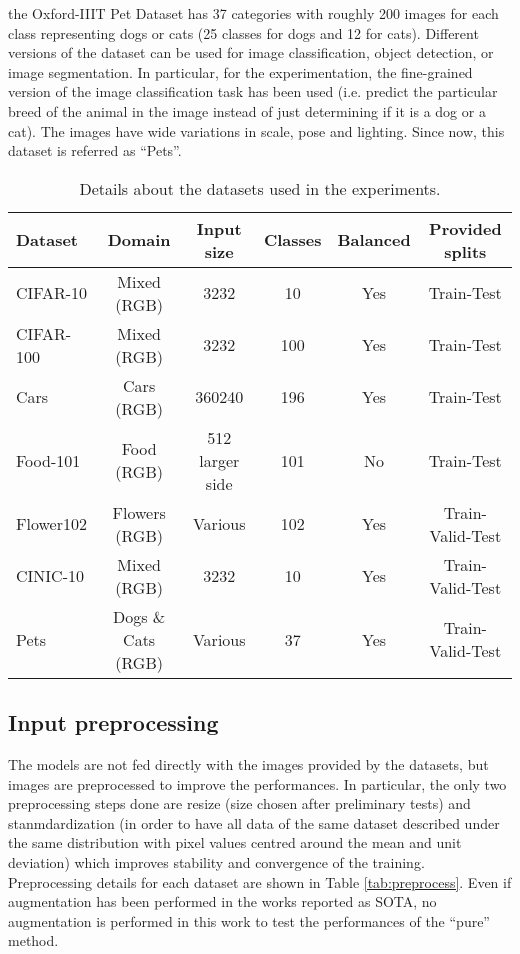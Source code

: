 \documentclass[review]{elsarticle}
\begin{document}
 the Oxford-IIIT Pet Dataset has 37 categories with roughly 200 images for each class representing dogs or cats (25 classes for dogs and 12 for cats). Different versions of the dataset can be used for image classification, object detection, or image segmentation. In particular, for the experimentation, the fine-grained version of the image classification task has been used (i.e. predict the particular breed of the animal in the image instead of just determining if it is a dog or a cat). The images have wide variations in scale, pose and lighting. Since now, this dataset is referred as ``Pets''.
\\
\begin{table*}[h]
\caption{Details about the datasets used in the  experiments.}
\newcommand\T{\rule{0pt}{2.5ex}}
\begin{center}
\begin{tabular}{lccccc}
{\bf Dataset} &  {\bf Domain} & {\bf Input size} & {\bf Classes}  & {\bf Balanced} & {\bf Provided splits}\\
    \hline
    \T
    CIFAR-10 & Mixed (RGB) & 3232 & 10 & Yes & Train-Test \\
    CIFAR-100 & Mixed (RGB) & 3232 & 100 & Yes & Train-Test \\
    Cars & Cars (RGB) & 360240 & 196 & Yes & Train-Test \\
    Food-101 & Food (RGB) & 512 larger side & 101 & No & Train-Test \\
    Flower102 & Flowers (RGB) & Various & 102 & Yes & Train-Valid-Test \\
    CINIC-10 & Mixed (RGB) & 3232 & 10 & Yes & Train-Valid-Test \\
    Pets & Dogs \& Cats (RGB) & Various & 37 & Yes & Train-Valid-Test 
\end{tabular}
\end{center}
\label{tab:datasetinfo}
\end{table*}

\subsection{Input preprocessing}
The models are not fed directly with the images provided by the datasets, but images are preprocessed to improve the performances. In particular, the only two preprocessing steps done are resize (size chosen after preliminary tests) and stanmdardization (in order to have all data of the same dataset described under the same distribution with pixel values centred around the mean and unit deviation) which improves stability and convergence of the training. Preprocessing details for each dataset are shown in Table \ref{tab:preprocess}. Even if augmentation has been performed in the works reported as SOTA, no augmentation is performed in this work to test the performances of the ``pure'' method.
\end{document}
